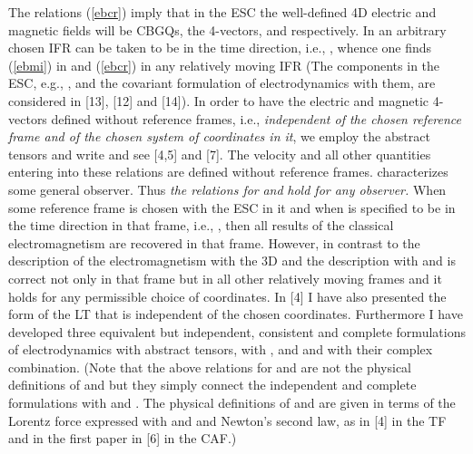 \documentclass[a4paper,showpacs,preprintnumbers,amsmath,amssymb]{revtex4}
\begin{document}
The relations (\ref{ebcr}) imply that in the ESC the well-defined 4D
electric and magnetic fields will be CBGQs, the 4-vectors, \coordHE{} and \coordHE{} respectively. In an
arbitrary chosen IFR \coordHE{}  \coordHE{} can be taken to be in the time
direction, i.e., \coordHE{}, whence one finds (\ref{ebmi}) in \coordHE{}
and (\ref{ebcr}) in any relatively moving IFR \coordHE{} (The components
in the ESC, e.g., \coordHE{}, and the covariant
formulation of electrodynamics with them, are considered in [13], [12] and
[14]). In order to have the electric and magnetic 4-vectors defined without
reference frames, i.e., \emph{independent of the chosen reference frame and
of the chosen system of coordinates in it}, we employ the abstract tensors
and write \coordHE{} and \coordHE{} see [4,5] and [7]. The velocity \coordHE{} and all other
quantities entering into these relations are defined without reference
frames. \coordHE{} characterizes some general observer. Thus \emph{the
relations for} \coordHE{} \emph{and }\coordHE{} \emph{hold for any observer.} When
some reference frame is chosen with the ESC in it and when \coordHE{} is
specified to be in the time direction in that frame, i.e., \coordHE{},
then all results of the classical electromagnetism are recovered in that
frame. However, in contrast to the description of the electromagnetism with
the 3D \coordHE{} and \coordHE{} the description with \coordHE{} and \coordHE{} is correct not only in that frame but in all other relatively moving
frames and it holds for any permissible choice of coordinates. In [4] I have
also presented the form of the LT that is independent of the chosen
coordinates. Furthermore I have developed three equivalent but independent,
consistent and complete formulations of electrodynamics with abstract
tensors, with \coordHE{}, \coordHE{} and \coordHE{} and with their complex
combination. (Note that the above relations for \coordHE{} and \coordHE{} are not
the physical definitions of \coordHE{} and \coordHE{} but they simply connect the
independent and complete formulations with \coordHE{} and \coordHE{}  \coordHE{}.
The physical definitions of \coordHE{} and \coordHE{} are given in terms of the
Lorentz force expressed with \coordHE{} and \coordHE{} and Newton's second law, as
in [4] in the TF and in the first paper in [6] in the CAF.)
\end{document}
